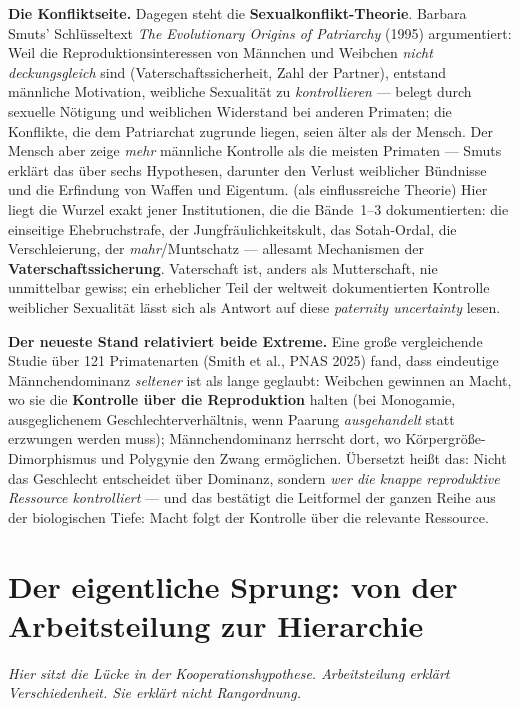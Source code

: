 \documentclass[11pt,a4paper,ngerman]{scrartcl}
\newcommand{\chipbase}[2]{\hspace{0pt}{\footnotesize\textcolor{#1}{[\textsc{#2}]}}}
\newcommand{\chipbelegt}[1]{\chipbase{chipgreen}{#1}}
\newcommand{\chipplausibel}[1]{\chipbase{chipamber}{#1}}
\begin{document}
\textbf{Die Konfliktseite.} Dagegen steht die \textbf{Sexualkonflikt-Theorie}. Barbara Smuts' Schlüsseltext \emph{The Evolutionary Origins of Patriarchy} (1995) argumentiert: Weil die Reproduktionsinteressen von Männchen und Weibchen \emph{nicht deckungsgleich} sind (Vaterschaftssicherheit, Zahl der Partner), entstand männliche Motivation, weibliche Sexualität zu \emph{kontrollieren} --- belegt durch sexuelle Nötigung und weiblichen Widerstand bei anderen Primaten; die Konflikte, die dem Patriarchat zugrunde liegen, seien älter als der Mensch. Der Mensch aber zeige \emph{mehr} männliche Kontrolle als die meisten Primaten --- Smuts erklärt das über sechs Hypothesen, darunter den Verlust weiblicher Bündnisse und die Erfindung von Waffen und Eigentum. \chipbelegt{belegt} (als einflussreiche Theorie) Hier liegt die Wurzel exakt jener Institutionen, die die Bände~1--3 dokumentierten: die einseitige Ehebruchstrafe, der Jungfräulichkeitskult, das Sotah-Ordal, die Verschleierung, der \emph{mahr}/Muntschatz --- allesamt Mechanismen der \textbf{Vaterschaftssicherung}. Vaterschaft ist, anders als Mutterschaft, nie unmittelbar gewiss; ein erheblicher Teil der weltweit dokumentierten Kontrolle weiblicher Sexualität lässt sich als Antwort auf diese \emph{paternity uncertainty} lesen. \chipplausibel{plausibel}

\textbf{Der neueste Stand relativiert beide Extreme.} Eine große vergleichende Studie über 121 Primatenarten (Smith et al., PNAS 2025) fand, dass eindeutige Männchendominanz \emph{seltener} ist als lange geglaubt: Weibchen gewinnen an Macht, wo sie die \textbf{Kontrolle über die Reproduktion} halten (bei Monogamie, ausgeglichenem Geschlechterverhältnis, wenn Paarung \emph{ausgehandelt} statt erzwungen werden muss); Männchendominanz herrscht dort, wo Körpergröße-Dimorphismus und Polygynie den Zwang ermöglichen. \chipbelegt{belegt} Übersetzt heißt das: Nicht das Geschlecht entscheidet über Dominanz, sondern \emph{wer die knappe reproduktive Ressource kontrolliert} --- und das bestätigt die Leitformel der ganzen Reihe aus der biologischen Tiefe: Macht folgt der Kontrolle über die relevante Ressource.

\section{Der eigentliche Sprung: von der Arbeitsteilung zur Hierarchie}
\noindent\textit{Hier sitzt die Lücke in der Kooperationshypothese. Arbeitsteilung erklärt \emph{Verschiedenheit}. Sie erklärt nicht \emph{Rangordnung}.}
\medskip
\end{document}
